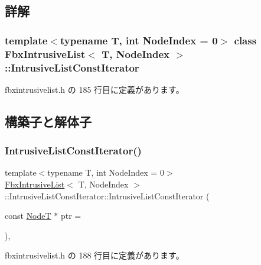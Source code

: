 \subsection{詳解}
\subsubsection*{template$<$typename T, int Node\+Index = 0$>$\newline
class Fbx\+Intrusive\+List$<$ T, Node\+Index $>$\+::\+Intrusive\+List\+Const\+Iterator}



 fbxintrusivelist.\+h の 185 行目に定義があります。



\subsection{構築子と解体子}
\mbox{\label{class_fbx_intrusive_list_1_1_intrusive_list_const_iterator_a1d488b117949a719831d28c8bef98386}} 
\subsubsection{\texorpdfstring{Intrusive\+List\+Const\+Iterator()}{IntrusiveListConstIterator()}}
{\footnotesize\ttfamily template$<$typename T, int Node\+Index = 0$>$ \\
\hyperlink{class_fbx_intrusive_list}{Fbx\+Intrusive\+List}$<$ T, Node\+Index $>$\+::Intrusive\+List\+Const\+Iterator\+::\+Intrusive\+List\+Const\+Iterator (\begin{DoxyParamCaption}\item[{const \hyperlink{class_fbx_intrusive_list_a6ffda382a6d029a042cbb0110853680c}{NodeT} $\ast$}]{ptr = {} }\end{DoxyParamCaption})\hspace{0.3cm}{\ttfamily [inline]}, {\ttfamily [explicit]}}



 fbxintrusivelist.\+h の 188 行目に定義があります。



